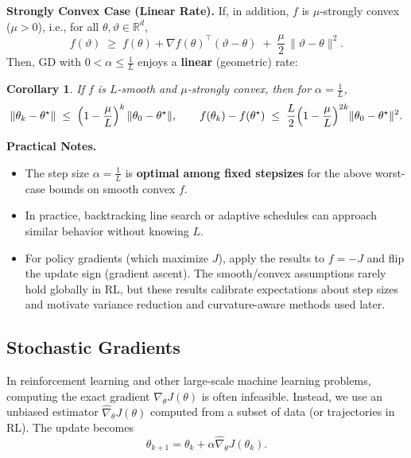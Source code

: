 \documentclass[
]{book}
\newtheorem{corollary}{Corollary}[chapter]
\theoremstyle{definition}
\theoremstyle{definition}
\theoremstyle{definition}
\theoremstyle{definition}
\theoremstyle{remark}
\begin{document}
\textbf{Strongly Convex Case (Linear Rate).} If, in addition, \(f\) is \(\mu\)-strongly convex (\(\mu>0\)), i.e., for all \(\theta,\vartheta\in\mathbb{R}^d\),
\begin{equation}
f(\vartheta)\;\ge\; f(\theta) + \nabla f(\theta)^\top(\vartheta-\theta) \;+\; \frac{\mu}{2}\,\|\vartheta-\theta\|^2.
\label{eq:PG-GO-strongly-convex}
\end{equation}
Then, GD with \(0<\alpha\le \frac{1}{L}\) enjoys a \textbf{linear} (geometric) rate:

\begin{corollary}
\protect\hypertarget{cor:gd-strongly-convex}{}\label{cor:gd-strongly-convex}If \(f\) is \(L\)-smooth and \(\mu\)-strongly convex, then for \(\alpha=\frac{1}{L}\),
\[
\|\theta_k-\theta^\star\|
\;\le\;
\Bigl(1-\frac{\mu}{L}\Bigr)^k \,\|\theta_0-\theta^\star\|,
\qquad
f(\theta_k)-f(\theta^\star)
\;\le\;
\frac{L}{2}\Bigl(1-\frac{\mu}{L}\Bigr)^{2k}\|\theta_0-\theta^\star\|^2.
\]
\end{corollary}

\textbf{Practical Notes.}

\begin{itemize}
\item
  The step size \(\alpha=\frac{1}{L}\) is \textbf{optimal among fixed stepsizes} for the above worst-case bounds on smooth convex \(f\).
\item
  In practice, backtracking line search or adaptive schedules can approach similar behavior without knowing \(L\).
\item
  For policy gradients (which maximize \(J\)), apply the results to \(f=-J\) and flip the update sign (gradient ascent). The smooth/convex assumptions rarely hold globally in RL, but these results calibrate expectations about step sizes and motivate variance reduction and curvature-aware methods used later.
\end{itemize}

\subsection{Stochastic Gradients}\label{stochastic-gradients}

In reinforcement learning and other large-scale machine learning problems, computing the exact gradient \(\nabla_\theta J(\theta)\) is often infeasible. Instead, we use an unbiased estimator \(\hat{\nabla}_\theta J(\theta)\) computed from a subset of data (or trajectories in RL). The update becomes
\[
\theta_{k+1} = \theta_k + \alpha \hat{\nabla}_\theta J(\theta_k).
\]
\end{document}

